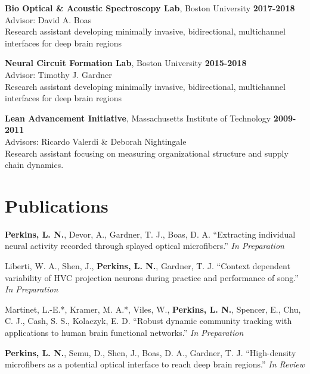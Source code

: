\textbf{Bio Optical \& Acoustic Spectroscopy Lab}, Boston University \hfill \textbf{2017-2018} \\
	Advisor: David A. Boas \\
	Research assistant developing minimally invasive, bidirectional, multichannel interfaces for deep brain regions

\bigskip

\noindent
\textbf{Neural Circuit Formation Lab}, Boston University \hfill \textbf{2015-2018} \\
	Advisor: Timothy J. Gardner \\
	Research assistant developing minimally invasive, bidirectional, multichannel interfaces for deep brain regions

\bigskip

\noindent
\textbf{Lean Advancement Initiative}, Massachusetts Institute of Technology \hfill \textbf{2009-2011} \\
	Advisors: Ricardo Valerdi \& Deborah Nightingale \\
	Research assistant focusing on measuring organizational structure and supply chain dynamics.

\section*{Publications}

\textbf{Perkins, L. N.}, Devor, A., Gardner, T. J., Boas, D. A. ``Extracting individual neural activity recorded through splayed optical microfibers.'' \textit{In Preparation}

\bigskip

\noindent
Liberti, W. A., Shen, J., \textbf{Perkins, L. N.}, Gardner, T. J. ``Context dependent variability of HVC projection neurons during practice and performance of song.'' \textit{In Preparation}

\bigskip

\noindent
Martinet, L.-E.*, Kramer, M. A.*, Viles, W., \textbf{Perkins, L. N.}, Spencer, E., Chu, C. J., Cash, S. S., Kolaczyk, E. D. ``Robust dynamic community tracking with applications to human brain functional networks.'' \textit{In Preparation}

\bigskip

\noindent
\textbf{Perkins, L. N.}, Semu, D., Shen, J., Boas, D. A., Gardner, T. J. ``High-density microfibers as a potential optical interface to reach deep brain regions.'' \textit{In Review}

\bigskip

